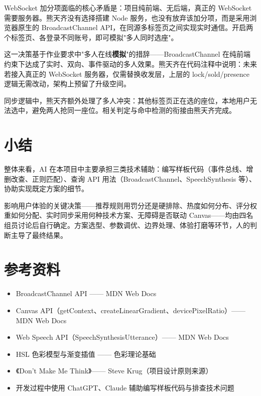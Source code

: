 \documentclass[12pt,a4paper]{ctexart}
\begin{document}
WebSocket 加分项面临的核心矛盾是：项目纯前端、无后端，真正的 WebSocket 需要服务器。熊天齐没有选择搭建 Node 服务，也没有放弃该加分项，而是采用浏览器原生的 BroadcastChannel API，在同源多标签页之间实现实时通信。开启两个标签页、各登录不同账号，即可模拟"多人同时选座"。

这一决策基于作业要求中"多人在线\textbf{模拟}"的措辞——BroadcastChannel 在纯前端约束下达成了实时、双向、事件驱动的多人效果。熊天齐在代码注释中说明：未来若接入真正的 WebSocket 服务器，仅需替换收发层，上层的 lock/sold/presence 逻辑无需改动，架构上预留了升级空间。

同步逻辑中，熊天齐额外处理了多人冲突：其他标签页正在选的座位，本地用户无法选中，避免两人抢同一座位。相关判定与命中检测的衔接由熊天齐完成。

\section{小结}

整体来看，AI 在本项目中主要承担三类技术辅助：编写样板代码（事件总线、增删改查、正则匹配）、查询 API 用法（BroadcastChannel、SpeechSynthesis 等）、协助实现既定方案的细节。

影响用户体验的关键决策——推荐规则用罚分还是硬排除、热度如何分布、评分权重如何分配、实时同步采用何种技术方案、无障碍是否联动 Canvas——均由四名组员讨论后自行确定。方案选型、参数调优、边界处理、体验打磨等环节，人的判断主导了最终结果。

\section{参考资料}

\begin{itemize}
  \item BroadcastChannel API —— MDN Web Docs
  \item Canvas API（getContext、createLinearGradient、devicePixelRatio）—— MDN Web Docs
  \item Web Speech API（SpeechSynthesisUtterance）—— MDN Web Docs
  \item HSL 色彩模型与渐变插值 —— 色彩理论基础
  \item 《Don't Make Me Think》—— Steve Krug（项目设计原则来源）
  \item 开发过程中使用 ChatGPT、Claude 辅助编写样板代码与排查技术问题
\end{itemize}
\end{document}
